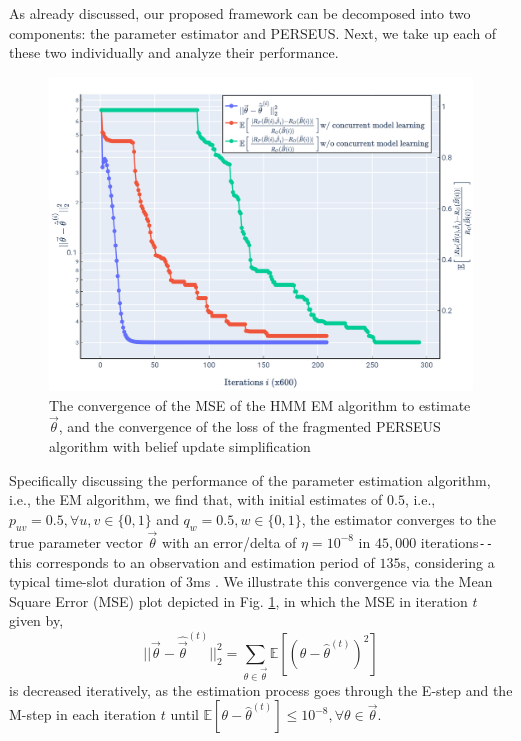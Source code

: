 \documentclass[12pt, draftcls, onecolumn]{IEEEtran}
\begin{document}
As already discussed, our proposed framework can be decomposed into two components: the parameter estimator and PERSEUS. Next, we take up each of these two individually and analyze their performance.
\begin{figure} [htb]
    \centerline{
    \includegraphics[width = 1.0\textwidth]{HMM_EM_Speed_Up.PNG}}
    \caption{The convergence of the MSE of the HMM EM algorithm to estimate $\vec{\theta}$, and the convergence of the loss of the fragmented PERSEUS algorithm with belief update simplification}
    \label{Fig. 7}
\end{figure}

Specifically discussing the performance of the parameter estimation algorithm, i.e., the EM algorithm, we find that, with initial estimates of $0.5$, i.e., $p_{uv}{=}0.5,{\forall}u,v{\in}\{0,1\}$ and $q_{w}{=}0.5,w{\in}\{0,1\}$, the estimator converges to the true parameter vector $\vec{\theta}$ with an error/delta of $\eta{=}10^{-8}$ in $45,000$ iterations\texttt{-{}-}this corresponds to an observation and estimation period of $135$s, considering a typical time-slot duration of $3$ms \cite{WCL:paper}. We illustrate this convergence via the Mean Square Error (MSE) plot depicted in Fig. \ref{Fig. 7}, in which the MSE in iteration $t$ given by,
\begin{equation}\label{32}
    ||\vec{\theta}-\hat{\vec{\theta}}^{(t)}||_{2}^{2}=\sum_{\theta \in \vec{\theta}}\mathbb{E}[(\theta-\hat{\theta}^{(t)})^{2}]
\end{equation}
is decreased iteratively, as the estimation process goes through the E-step and the M-step in each iteration $t$ until $\mathbb{E}[\theta{-}\hat{\theta}^{(t)}]{\leq}10^{-8},{\forall}\theta{\in}\vec{\theta}$.
\end{document}
